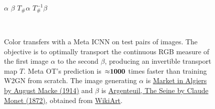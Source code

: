 \documentclass{article}
\begin{document}
\begin{figure}[t]
  {\Large \hspace{.4in} $\alpha$ \hspace{1.35in} $\beta$ \hspace{.9in} $T_\#\alpha$ \hspace{1in} $T_\#^{-1}\beta$} \\
   \\[-2.7mm]
  \caption{Color transfers with a Meta ICNN on test pairs of images.
    The objective is to optimally transport the continuous RGB measure
    of the first image $\alpha$ to the second $\beta$,
    producing an invertible transport map $T$.
    Meta OT's prediction is $\bf{\approx}1000$ times faster
    than training W2GN from scratch.
    The image generating $\alpha$ is
    \href{https://www.wikiart.org/en/august-macke/market-in-algiers}{Market in Algiers by August Macke (1914)}
    and
    $\beta$ is
    \href{https://www.wikiart.org/en/claude-monet/argenteuil-the-sein}{Argenteuil, The Seine by Claude Monet (1872)},
    obtained from
    \href{https://www.wikiart.org/}{WikiArt}.
  }
  \label{fig:transfer-test-images}
\end{figure}
\end{document}
